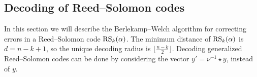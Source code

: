 \documentclass[../main.tex]{subfiles}
\begin{document}



\subsection{Decoding of Reed--Solomon codes}

In this section we will describe the Berlekamp--Welch algorithm for correcting errors in a Reed--Solomon code $\operatorname{RS}_k(\alpha)$. The minimum distance of $\operatorname{RS}_k(\alpha)$ is $d = n - k + 1$, so the unique decoding radius is $\lfloor \frac{n - k}{2} \rfloor$. Decoding generalized Reed--Solomon codes can be done by considering the vector $y' = \nu^{-1} \star y$, instead of $y$.
\end{document}
